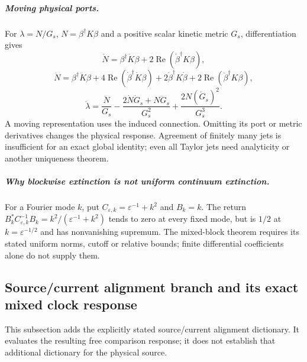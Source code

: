 \documentclass[11pt,a4paper]{article}
\begin{document}
\subparagraph{Moving physical ports.}
For \(\lambda=N/G_s\), \(N=\beta^\dagger K\beta\) and a positive scalar
kinetic metric \(G_s\), differentiation gives
\[
 \dot N=\beta^\dagger\dot K\beta+
 2\operatorname{Re}(\dot\beta^\dagger K\beta),
\]
\[
 \ddot N=\beta^\dagger\ddot K\beta+
 4\operatorname{Re}(\dot\beta^\dagger\dot K\beta)
 +2\dot\beta^\dagger K\dot\beta+
 2\operatorname{Re}(\ddot\beta^\dagger K\beta),
\]
\begin{equation}
 \label{p3f:eq:v2109-moving-port-response}
 \ddot\lambda=\frac{\ddot N}{G_s}
 -\frac{2\dot N\dot G_s+N\ddot G_s}{G_s^2}
 +\frac{2N(\dot G_s)^2}{G_s^3}.
\end{equation}
A moving representation uses the induced connection.  Omitting its port or
metric derivatives changes the physical response.  Agreement of finitely
many jets is insufficient for an exact global identity; even all Taylor
jets need analyticity or another uniqueness theorem.

\subparagraph{Why blockwise extinction is not uniform continuum extinction.}
For a Fourier mode \(k\), put \(C_{\varepsilon,k}=\varepsilon^{-1}+k^2\)
and \(B_k=k\).  The return
\(B_k^*C_{\varepsilon,k}^{-1}B_k=k^2/(\varepsilon^{-1}+k^2)\)
tends to zero at every fixed mode, but is \(1/2\) at
\(k=\varepsilon^{-1/2}\) and has nonvanishing supremum.  The mixed-block
theorem requires its stated uniform norms, cutoff or relative bounds;
finite differential coefficients alone do not supply them.





\subsection{Source/current alignment branch and its exact mixed clock response}
\label{p3f:app:v2168-source-current-alignment}
This subsection adds the explicitly stated source/current alignment dictionary.
It evaluates the resulting free comparison response; it does not establish
that additional dictionary for the physical source.
\end{document}
